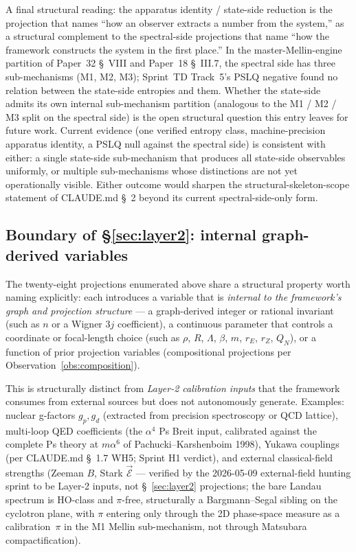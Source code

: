 \documentclass[11pt]{article}
\begin{document}
A final structural reading: the apparatus identity / state-side
reduction is the projection that names ``how an observer extracts a
number from the system,'' as a structural complement to the
spectral-side projections that name ``how the framework constructs
the system in the first place.''  In the master-Mellin-engine
partition of Paper~32 \S~VIII and Paper~18 \S~III.7, the spectral
side has three sub-mechanisms (M1, M2, M3); Sprint~TD Track~5's PSLQ
negative found no relation between the state-side entropies and them.  Whether the
state-side admits its own internal sub-mechanism partition
(analogous to the M1 / M2 / M3 split on the spectral side) is the
open structural question this entry leaves for future work.  Current
evidence (one verified entropy class, machine-precision apparatus
identity, a PSLQ null against the spectral side) is consistent with
either: a single state-side sub-mechanism that produces all
state-side observables uniformly, or multiple sub-mechanisms whose
distinctions are not yet operationally visible.  Either outcome would
sharpen the structural-skeleton-scope statement of CLAUDE.md \S~2
beyond its current spectral-side-only form.

\subsection{Boundary of \S\ref{sec:layer2}: internal graph-derived variables}
\label{sec:layer2_boundary}

The twenty-eight projections enumerated above share a structural
property worth naming explicitly: each introduces a variable that
is \emph{internal to the framework's graph and projection structure}
--- a graph-derived integer or rational invariant (such as $n$ or a
Wigner $3j$ coefficient), a
continuous parameter that controls a coordinate or focal-length
choice (such as $\rho$, $R$, $\Lambda$, $\beta$, $m$, $r_E$, $r_Z$,
$Q_N$), or a function of prior projection variables (compositional
projections per Observation~\ref{obs:composition}).

This is structurally distinct from \emph{Layer-2 calibration inputs}
that the framework consumes from external sources but does not
autonomously generate.  Examples: nuclear g-factors $g_p, g_d$
(extracted from precision spectroscopy or QCD lattice), multi-loop
QED coefficients (the $\alpha^4$ Ps Breit input, calibrated against
the complete Ps theory at $m\alpha^6$ of Pachucki--Karshenboim 1998), Yukawa couplings (per CLAUDE.md
\S~1.7 WH5; Sprint H1 verdict), and external classical-field
strengths (Zeeman $B$, Stark $\vec{\mathcal{E}}$ --- verified by the
2026-05-09 external-field hunting sprint to be Layer-2 inputs, not
\S~\ref{sec:layer2} projections; the bare Landau spectrum is HO-class
and $\pi$-free, structurally a Bargmann--Segal sibling on the
cyclotron plane, with $\pi$ entering only through the 2D phase-space
measure as a calibration~$\pi$ in the M1 Mellin sub-mechanism, not
through Matsubara compactification).
\end{document}
